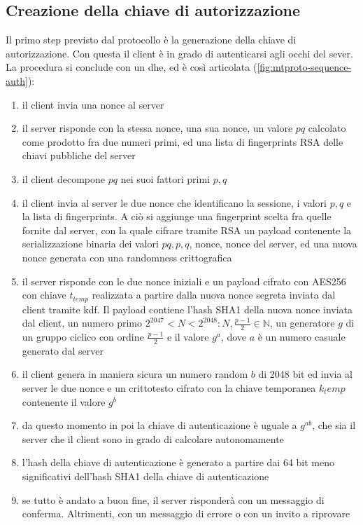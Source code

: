 \subsection{Creazione della chiave di autorizzazione}
\label{sec:auth-key}
Il primo step previsto dal protocollo è la generazione della chiave di autorizzazione.
Con questa il client è in grado di autenticarsi agli occhi del sever. \\
La procedura si conclude con un \gls{dhe}, ed è così articolata (\autoref{fig:mtproto-sequence-auth}):
\begin{enumerate}
    \item il client invia una nonce al server
    \item il server risponde con la stessa nonce, una sua nonce, un valore $pq$ calcolato come prodotto fra due numeri primi,
          ed una lista di fingerprints RSA delle chiavi pubbliche del server
    \item il client decompone $pq$ nei suoi fattori primi $p, q$
    \item il client invia al server le due nonce che identificano la sessione, i valori $p, q$ e la lista di fingerprints.
          A ciò si aggiunge una fingerprint scelta fra quelle fornite dal server, con la quale cifrare tramite RSA un payload contenente
          la serializzazione binaria dei valori $pq, p, q$, nonce, nonce del server, ed una nuova nonce generata con una randomness crittografica
    \item il server risponde con le due nonce iniziali e un payload cifrato con AES256 con chiave $t_{temp}$ realizzata a partire dalla nuova nonce segreta inviata dal client tramite \gls{kdf}.
          Il payload contiene l'hash SHA1 della nuova nonce inviata dal client,
          un numero primo $2^{2047} < N < 2^{2048} : N, \frac{p-1}{2} \in \mathbb{N}$, un generatore $g$ di un gruppo ciclico con ordine $\frac{p-1}{2}$ e il valore $g^a$,
          dove $a$ è un numero casuale generato dal server
    \item il client genera in maniera sicura un numero random $b$ di 2048 bit ed invia al server le due nonce e un crittotesto
          cifrato con la chiave temporanea ${k_temp}$ contenente il valore $g^b$
    \item da questo momento in poi la chiave di autenticazione è uguale a $g^{ab}$, che sia il server che il client sono in grado di calcolare autonomamente
    \item l'hash della chiave di autenticazione è generato a partire dai 64 bit meno significativi dell'hash SHA1 della chiave di autenticazione
    \item se tutto è andato a buon fine, il server risponderà con un messaggio di conferma. Altrimenti, con un messaggio di errore o con un invito a riprovare
\end{enumerate}

